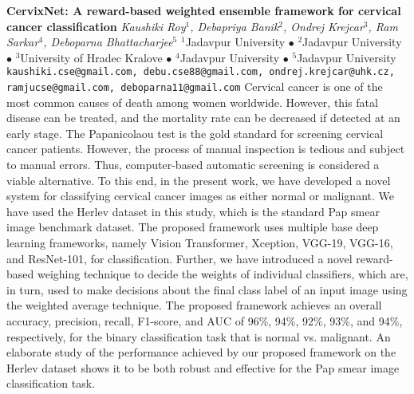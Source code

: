 
    \begin{conf-abstract}[]
        {\textbf{CervixNet: A reward-based weighted ensemble framework for cervical cancer classification}}
        {\textit{Kaushiki Roy$^{1}$, Debapriya Banik$^{2}$, Ondrej Krejcar$^{3}$, Ram Sarkar$^{4}$, Deboparna  Bhattacharjee$^{5}$}}
        {$^{1}$Jadavpur University $\bullet$ $^{2}$Jadavpur University $\bullet$ $^{3}$University of Hradec Kralove $\bullet$ $^{4}$Jadavpur University $\bullet$ $^{5}$Jadavpur University}
        {\texttt{kaushiki.cse@gmail.com, debu.cse88@gmail.com, ondrej.krejcar@uhk.cz, ramjucse@gmail.com, deboparna11@gmail.com}}
        {Cervical cancer is one of the most common causes of death among women worldwide. However, this fatal disease can be treated, and the mortality rate can be decreased if detected at an early stage. The Papanicolaou test is the gold standard for screening cervical cancer patients. However, the process of manual inspection is tedious and subject to manual errors. Thus, computer-based automatic screening is considered a viable alternative. To this end, in the present work, we have developed a novel system for classifying cervical cancer images as either normal or malignant. We have used the Herlev dataset in this study, which is the standard Pap smear image benchmark dataset. The proposed framework uses multiple base deep learning frameworks, namely Vision Transformer, Xception, VGG-19, VGG-16, and ResNet-101, for classification. Further, we have introduced a novel reward-based weighing technique to decide the weights of individual classifiers, which are, in turn, used to make decisions about the final class label of an input image using the weighted average technique. The proposed framework achieves an overall accuracy, precision, recall, F1-score, and AUC of 96\%, 94\%, 92\%, 93\%, and 94\%, respectively, for the binary classification task that is normal vs. malignant. An elaborate study of the performance achieved by our proposed framework on the Herlev dataset shows it to be both robust and effective for the Pap smear image classification task.}
    \end{conf-abstract}
        